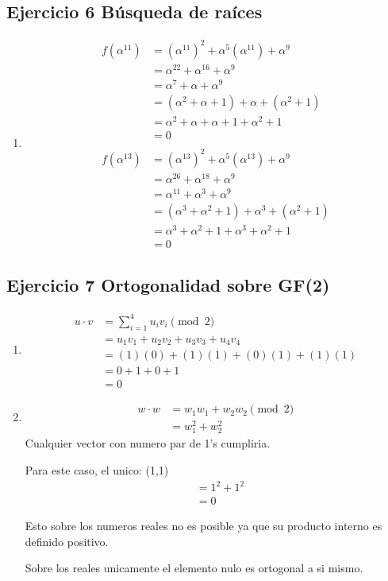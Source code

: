 \documentclass[11pt,fleqn]{article}
\begin{document}
\subsection*{Ejercicio 6 Búsqueda de raíces}
\begin{enumerate}[label=\alph*)]
\item {}
\begin{align*}
f(\alpha^{11})
&=(\alpha^{11})^2+\alpha^5(\alpha^{11})+\alpha^9\\
&=\alpha^{22}+\alpha^{16}+\alpha^9\\
&=\alpha^7+\alpha+\alpha^9\\
&=(\alpha^2+\alpha+1)+\alpha+(\alpha^2+1)\\
&=\alpha^2+\alpha+\alpha+1+\alpha^2+1\\
&=0\\ \\
f(\alpha^{13})
&=(\alpha^{13})^2+\alpha^5(\alpha^{13})+\alpha^9\\
&=\alpha^{26}+\alpha^{18}+\alpha^9\\
&=\alpha^{11}+\alpha^3+\alpha^9\\
&=(\alpha^3+\alpha^2+1)+\alpha^3+(\alpha^2+1)\\
&=\alpha^3+\alpha^2+1+\alpha^3+\alpha^2+1\\
&=0
\end{align*}

\end{enumerate}

\subsection*{Ejercicio 7 Ortogonalidad sobre GF(2)}
\begin{enumerate}[label=\alph*)]
\item {}
\begin{align*}
u\cdot v
&=\sum_{i=1}^{4}u_iv_i \pmod{2}\\
&=u_1v_1+u_2v_2+u_3v_3+u_4v_4\\
&=(1)(0)+(1)(1)+(0)(1)+(1)(1)\\
&=0+1+0+1\\
&=0
\end{align*}

\item {}
\begin{align*}
w\cdot w
&=w_1w_1+w_2w_2 \pmod{2}\\
&=w_1^2+w_2^2
\end{align*}
Cualquier vector con numero par de 1's cumpliria.

Para este caso, el unico: (1,1)
\begin{align*}
&=1^2+1^2\\
&=0
\end{align*}

Esto sobre los numeros reales no es posible ya que su producto interno es definido positivo.

Sobre los reales unicamente el elemento nulo es ortogonal a si mismo.
\end{enumerate}
\end{document}
